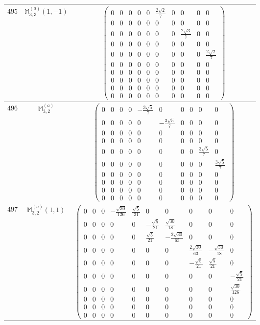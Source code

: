 \documentclass[fleqn,8pt,landscape]{jsarticle}
\begin{document}
\begin{center}
\begin{longtable}{ccc}
$ 495 $ & $ \mathbb{M}_{3,3}^{(a)}(1,-1) $ & $ \begin{pmatrix} 0 & 0 & 0 & 0 & 0 & \frac{2 \sqrt{2}}{7} & 0 & 0 & 0 & 0 \\ 0 & 0 & 0 & 0 & 0 & 0 & 0 & 0 & 0 & 0 \\ 0 & 0 & 0 & 0 & 0 & 0 & 0 & \frac{2 \sqrt{3}}{7} & 0 & 0 \\ 0 & 0 & 0 & 0 & 0 & 0 & 0 & 0 & 0 & 0 \\ 0 & 0 & 0 & 0 & 0 & 0 & 0 & 0 & 0 & \frac{2 \sqrt{2}}{7} \\ 0 & 0 & 0 & 0 & 0 & 0 & 0 & 0 & 0 & 0 \\ 0 & 0 & 0 & 0 & 0 & 0 & 0 & 0 & 0 & 0 \\ 0 & 0 & 0 & 0 & 0 & 0 & 0 & 0 & 0 & 0 \\ 0 & 0 & 0 & 0 & 0 & 0 & 0 & 0 & 0 & 0 \\ 0 & 0 & 0 & 0 & 0 & 0 & 0 & 0 & 0 & 0 \end{pmatrix} $ \\ \hline
$ 496 $ & $ \mathbb{M}_{3,2}^{(a)} $ & $ \begin{pmatrix} 0 & 0 & 0 & 0 & - \frac{3 \sqrt{5}}{7} & 0 & 0 & 0 & 0 & 0 \\ 0 & 0 & 0 & 0 & 0 & - \frac{3 \sqrt{5}}{7} & 0 & 0 & 0 & 0 \\ 0 & 0 & 0 & 0 & 0 & 0 & 0 & 0 & 0 & 0 \\ 0 & 0 & 0 & 0 & 0 & 0 & 0 & 0 & 0 & 0 \\ 0 & 0 & 0 & 0 & 0 & 0 & 0 & 0 & \frac{3 \sqrt{5}}{7} & 0 \\ 0 & 0 & 0 & 0 & 0 & 0 & 0 & 0 & 0 & \frac{3 \sqrt{5}}{7} \\ 0 & 0 & 0 & 0 & 0 & 0 & 0 & 0 & 0 & 0 \\ 0 & 0 & 0 & 0 & 0 & 0 & 0 & 0 & 0 & 0 \\ 0 & 0 & 0 & 0 & 0 & 0 & 0 & 0 & 0 & 0 \\ 0 & 0 & 0 & 0 & 0 & 0 & 0 & 0 & 0 & 0 \end{pmatrix} $ \\ \hline
$ 497 $ & $ \mathbb{M}_{3,2}^{(a)}(1,1) $ & $ \begin{pmatrix} 0 & 0 & 0 & - \frac{\sqrt{30}}{126} & \frac{\sqrt{5}}{21} & 0 & 0 & 0 & 0 & 0 \\ 0 & 0 & 0 & 0 & 0 & - \frac{\sqrt{5}}{21} & \frac{\sqrt{30}}{18} & 0 & 0 & 0 \\ 0 & 0 & 0 & 0 & 0 & \frac{\sqrt{5}}{21} & - \frac{2 \sqrt{30}}{63} & 0 & 0 & 0 \\ 0 & 0 & 0 & 0 & 0 & 0 & 0 & \frac{2 \sqrt{30}}{63} & - \frac{\sqrt{30}}{18} & 0 \\ 0 & 0 & 0 & 0 & 0 & 0 & 0 & - \frac{\sqrt{5}}{21} & \frac{\sqrt{5}}{21} & 0 \\ 0 & 0 & 0 & 0 & 0 & 0 & 0 & 0 & 0 & - \frac{\sqrt{5}}{21} \\ 0 & 0 & 0 & 0 & 0 & 0 & 0 & 0 & 0 & \frac{\sqrt{30}}{126} \\ 0 & 0 & 0 & 0 & 0 & 0 & 0 & 0 & 0 & 0 \\ 0 & 0 & 0 & 0 & 0 & 0 & 0 & 0 & 0 & 0 \\ 0 & 0 & 0 & 0 & 0 & 0 & 0 & 0 & 0 & 0 \end{pmatrix} $ \\ \hline

\end{longtable}
\end{center}
\end{document}
